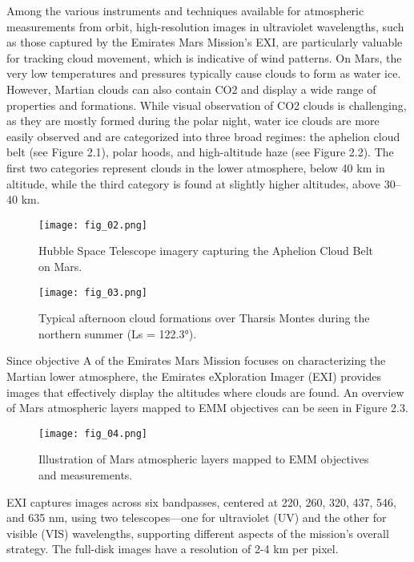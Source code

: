 Among the various instruments and techniques available for atmospheric measurements from orbit, high-resolution images in ultraviolet wavelengths, such as those captured by the Emirates Mars Mission's EXI\cite{Jones2021}, are particularly valuable for tracking cloud movement, which is indicative of wind patterns. 
On Mars, the very low temperatures and pressures typically cause clouds to form as water ice. However, Martian clouds can also contain CO2 and display a wide range of properties and formations\cite{clancyetalChapter052017}. While visual observation of CO2 clouds is challenging, as they are mostly formed during the polar night, water ice clouds are more easily observed and are categorized into three broad regimes: the aphelion cloud belt (see Figure 2.1), polar hoods, and high-altitude haze (see Figure 2.2). The first two categories represent clouds in the lower atmosphere, below 40 km in altitude, while the third category is found at slightly higher altitudes, above 30–40 km\cite{clancyetalChapter052017}.
\FloatBarrier
\begin{figure}[h!] 
    \centering
    \texttt{[image: fig\_02.png]}
    \caption{Hubble Space Telescope imagery capturing the Aphelion Cloud Belt on Mars\cite{clancyetalChapter052017}.}
\end{figure}
\FloatBarrier
\begin{figure}[h!] 
    \centering
    \texttt{[image: fig\_03.png]}
    \caption{Typical afternoon cloud formations over Tharsis Montes during the northern summer (Ls = 122.3°)\cite{clancyetalChapter052017}.}
\end{figure}
\FloatBarrier
Since objective A of the Emirates Mars Mission focuses on characterizing the Martian lower atmosphere, the Emirates eXploration Imager (EXI) provides images that effectively display the altitudes where clouds are found\cite{Amiri2022}. An overview of Mars atmospheric layers mapped to EMM objectives can be seen in Figure 2.3. 
\FloatBarrier
\begin{figure}[h!] 
    \centering
    \texttt{[image: fig\_04.png]}
    \caption{Illustration of Mars atmospheric layers mapped to EMM objectives and measurements\cite{Almatroushi2021}.}
\end{figure}
\FloatBarrier
EXI captures images across six bandpasses, centered at 220, 260, 320, 437, 546, and 635 nm, using two telescopes—one for ultraviolet (UV) and the other for visible (VIS) wavelengths, supporting different aspects of the mission's overall strategy. The full-disk images have a resolution of 2-4 km per pixel\cite{Jones2021}.

